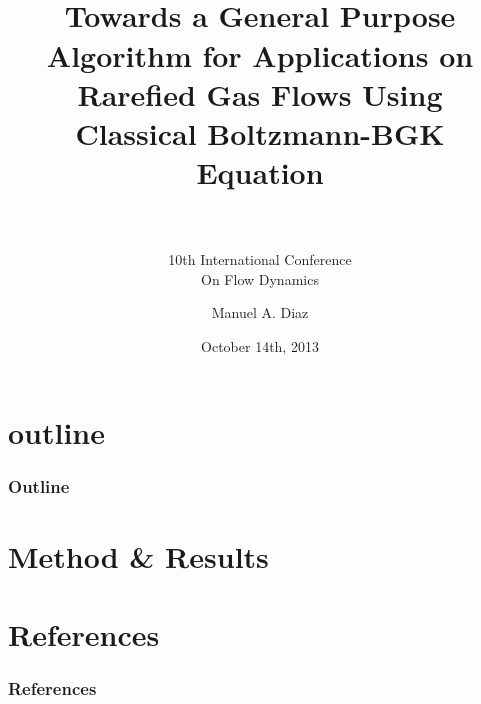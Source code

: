 

\title[ICFD 2013 \hspace{4em}\insertframenumber/
\inserttotalframenumber]{~ \\ Towards a General Purpose Algorithm for Applications on Rarefied Gas Flows Using \\
Classical Boltzmann-BGK Equation \\~} %
\subtitle{10th International Conference \\ On Flow Dynamics}
\author[Aerodynamic Design \& Analysis Lab]{ Manuel A. Diaz} %
\date{October 14th, 2013}



\begin{frame} 
	\maketitle
\end{frame}

\section*{outline} 
\begin{frame}%
	\frametitle{Outline}
	\tableofcontents
\end{frame}




%


\section{Method \& Results}
%







\section{References}
\begin{frame}[allowframebreaks]
	\frametitle{References}
	
	
\end{frame}

